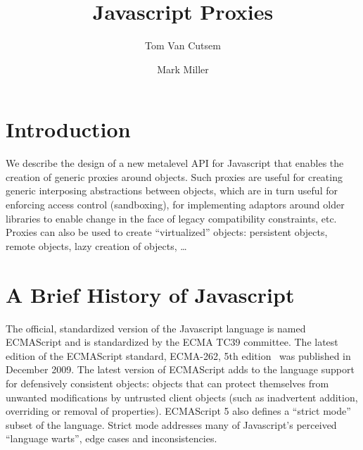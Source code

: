 \documentclass[10pt,legalpaper]{article}
\title{Javascript Proxies}
\author{Tom Van Cutsem \and Mark Miller}
\date{}
\begin{document}
\ifpdf
{}
\else
{}
\fi

\maketitle

\begin{abstract}
\end{abstract}

\section{Introduction}

We describe the design of a new metalevel API for Javascript that enables the creation of generic proxies around objects. Such proxies are useful for creating generic interposing abstractions between objects, which are in turn useful for enforcing access control (sandboxing), for implementing adaptors around older libraries to enable change in the face of legacy compatibility constraints, etc. Proxies can also be used to create ``virtualized'' objects: persistent objects, remote objects, lazy creation of objects, \ldots


\section{A Brief History of Javascript}

The official, standardized version of the Javascript language is named ECMAScript and is standardized by the ECMA TC39 committee. The latest edition of the ECMAScript standard, ECMA-262, 5th edition~\cite{ecma262} was published in December 2009. The latest version of ECMAScript adds to the language support for defensively consistent objects: objects that can protect themselves from unwanted modifications by untrusted client objects (such as inadvertent addition, overriding or removal of properties). ECMAScript 5 also defines a ``strict mode'' subset of the language. Strict mode addresses many of Javascript's perceived ``language warts'', edge cases and inconsistencies.
\end{document}
